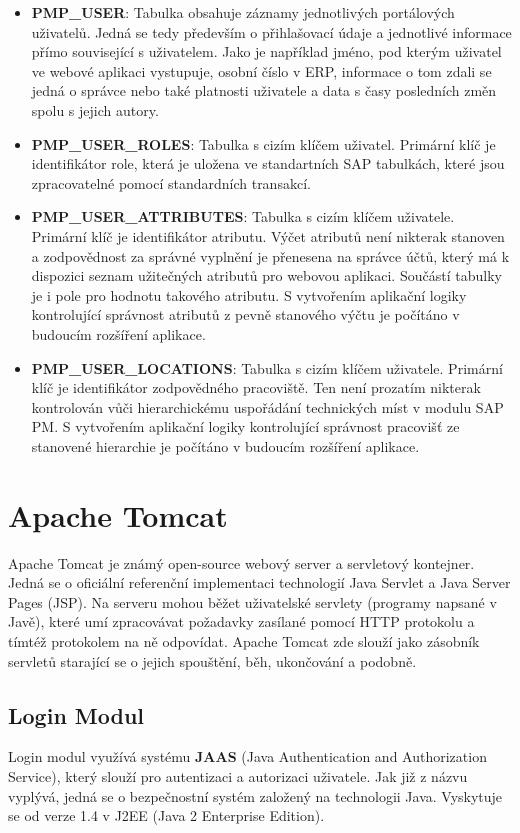 \documentclass[thesis=M,czech]{FITthesis}[2012/06/26]
\begin{document}
\begin{itemize}
	\item
	\textbf{PMP\_USER}: Tabulka obsahuje záznamy jednotlivých portálových uživatelů. Jedná se tedy především o přihlašovací údaje a jednotlivé informace přímo související s uživatelem. Jako je například jméno, pod kterým uživatel ve webové aplikaci vystupuje, osobní číslo v ERP, informace o tom zdali se jedná o správce nebo také platnosti uživatele a data s časy posledních změn spolu s jejich autory.
	\item
	\textbf{PMP\_USER\_ROLES}: Tabulka s cizím klíčem uživatel. Primární klíč je identifikátor role, která je uložena ve standartních SAP tabulkách, které jsou zpracovatelné pomocí standardních transakcí.
	\item
	\textbf{PMP\_USER\_ATTRIBUTES}: Tabulka s cizím klíčem uživatele. Primární klíč je identifikátor atributu. Výčet atributů není nikterak stanoven a zodpovědnost za správné vyplnění je přenesena na správce účtů, který má k dispozici seznam užitečných atributů pro webovou aplikaci. Součástí tabulky je i pole pro hodnotu takového atributu. S vytvořením aplikační logiky kontrolující správnost atributů z pevně stanového výčtu je počítáno v budoucím rozšíření aplikace.
	\item
	\textbf{PMP\_USER\_LOCATIONS}: Tabulka s cizím klíčem uživatele. Primární klíč je identifikátor zodpovědného pracoviště. Ten není prozatím nikterak kontrolován vůči hierarchickému uspořádání technických míst v modulu SAP PM. S vytvořením aplikační logiky kontrolující správnost pracovišť ze stanovené hierarchie je počítáno v budoucím rozšíření aplikace.
\end{itemize} 

\section{Apache Tomcat}
Apache Tomcat je známý open-source webový server a servletový kontejner. Jedná se o oficiální referenční implementaci technologií Java Servlet a Java Server Pages (JSP). Na serveru mohou běžet uživatelské servlety (programy napsané v Javě), které umí zpracovávat požadavky zasílané pomocí HTTP protokolu a tímtéž protokolem na ně odpovídat. Apache Tomcat zde slouží jako zásobník servletů starající se o jejich spouštění, běh, ukončování a podobně.

\subsection{Login Modul}
Login modul využívá systému \textbf{JAAS} (Java Authentication and Authorization Service), který slouží pro autentizaci a autorizaci uživatele. Jak již z názvu vyplývá, jedná se o bezpečnostní systém založený na technologii Java. Vyskytuje se od verze 1.4 v J2EE (Java 2 Enterprise Edition). 
\end{document}
